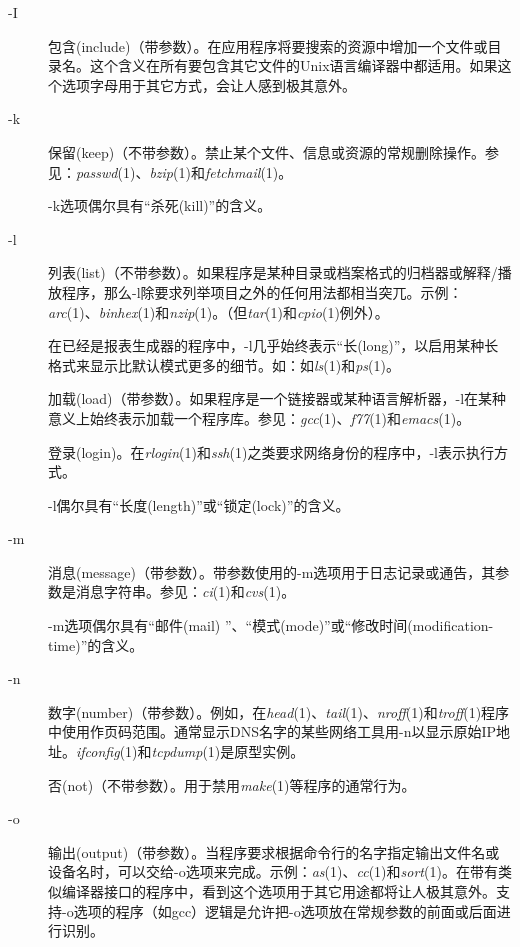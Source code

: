 \documentclass[12pt,oneside]{book}
\begin{document}
\begin{common-format}
\begin{description}
\item[-I] 包含(include)（带参数）。在应用程序将要搜索的资源中增加一个文件或目录名。这个含义在所有要包含其它文件的Unix语言编译器中都适用。如果这个选项字母用于其它方式，会让人感到极其意外。

\item[-k] 保留(keep)（不带参数）。禁止某个文件、信息或资源的常规删除操作。参见：\textit{passwd}(1)、\textit{bzip}(1)和\textit{fetchmail}(1)。

-k选项偶尔具有“杀死(kill)”的含义。

\item[-l] 列表(list)（不带参数）。如果程序是某种目录或档案格式的归档器或解释/播放程序，那么-l除要求列举项目之外的任何用法都相当突兀。示例：\textit{arc}(1)、\textit{binhex}(1)和\textit{nzip}(1)。（但\textit{tar}(1)和\textit{cpio}(1)例外）。

在已经是报表生成器的程序中，-l几乎始终表示“长(long)”，以启用某种长格式来显示比默认模式更多的细节。如：如\textit{ls}(1)和\textit{ps}(1)。

加载(load)（带参数）。如果程序是一个链接器或某种语言解析器，-l在某种意义上始终表示加载一个程序库。参见：\textit{gcc}(1)、\textit{f77}(1)和\textit{emacs}(1)。

 登录(login)。在\textit{rlogin}(1)和\textit{ssh}(1)之类要求网络身份的程序中，-l表示执行方式。

-l偶尔具有“长度(length)”或“锁定(lock)”的含义。

\item[-m] 消息(message)（带参数）。带参数使用的-m选项用于日志记录或通告，其参数是消息字符串。参见：\textit{ci}(1)和\textit{cvs}(1)。

-m选项偶尔具有“邮件(mail) ”、“模式(mode)”或“修改时间(modification-time)”的含义。

\item[-n] 数字(number)（带参数）。例如，在\textit{head}(1)、\textit{tail}(1)、\textit{nroff}(1)和\textit{troff}(1)程序中使用作页码范围。通常显示DNS名字的某些网络工具用-n以显示原始IP地址。\textit{ifconfig}(1)和\textit{tcpdump}(1)是原型实例。

否(not)（不带参数）。用于禁用\textit{make}(1)等程序的通常行为。

\item[-o] 输出(output)（带参数）。当程序要求根据命令行的名字指定输出文件名或设备名时，可以交给-o选项来完成。示例：\textit{as}(1)、\textit{cc}(1)和\textit{sort}(1)。在带有类似编译器接口的程序中，看到这个选项用于其它用途都将让人极其意外。支持-o选项的程序（如gcc）逻辑是允许把-o选项放在常规参数的前面或后面进行识别。


\end{description}
\end{common-format}
\end{document}
